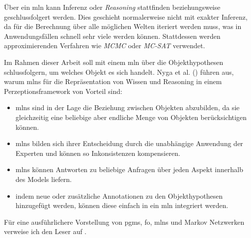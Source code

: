 Über ein \gls{mln} kann Inferenz oder \textit{Reasoning} stattfinden beziehungsweise geschlussfolgert werden. Dies geschieht normalerweise nicht mit exakter Inferenz, da für die Berechnung über alle möglichen Welten iteriert werden muss, was in Anwendungsfällen schnell sehr viele werden können. Stattdessen werden approximierenden Verfahren wie \textit{MCMC} oder \textit{MC-SAT} verwendet. \cite{nyga17} \par  
Im Rahmen dieser Arbeit soll \robosherlock mit einem \gls{mln} über die Objekthypothesen schlussfolgern, um welches Objekt es sich handelt. Nyga et al. (\cite{pr2looking}) führen aus, warum \glspl{mln} für die Repräsentation von Wissen und Reasoning in einem Perzeptionsframework von Vorteil sind: 
\begin{itemize}
	\item \glspl{mln} sind in der Lage die Beziehung zwischen Objekten abzubilden, da sie gleichzeitig eine beliebige aber endliche Menge von Objekten berücksichtigen können.
	\item \glspl{mln} bilden sich ihrer Entscheidung durch die unabhängige Anwendung der Experten und können so Inkonsistenzen kompensieren.
	\item \glspl{mln} können Antworten zu beliebige Anfragen über jeden Aspekt innerhalb des Models liefern. 
	\item indem neue oder zusätzliche Annotationen zu den Objekthypothesen hinzugefügt werden, können diese einfach in ein \gls{mln} integriert werden.    
\end{itemize}   
Für eine ausführlichere Vorstellung von \glspl{pgm}, \gls{fo}, \glspl{mln} und Markov Netzwerken verweise ich den Leser auf \cite{jain, nyga17, mln}. \par 

